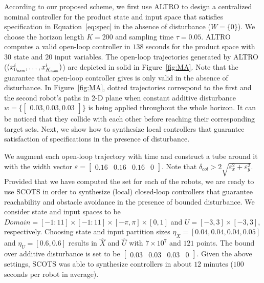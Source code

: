 According to our proposed scheme, we first use ALTRO to design a centralized nominal controller for the product state and input space that satisfies specification in Equation~\eqref{eq:spec} in the absence of disturbance ($W=\{0\}$). We choose the horizon length $K=200$ and sampling time $\tau=0.05$. ALTRO computes a valid open-loop controller in $138$ seconds for the product space with $30$ state and $20$ input variables. The open-loop trajectories generated by ALTRO ($(x_{0_{\mathit{nom}}}^i,\ldots,x_{K_{\mathit{nom}}}^i)$) are depicted in solid in Figure~\ref{fig:MA}. Note that the guarantee that open-loop controller gives is only valid in the absence of disturbance. In Figure~\ref{fig:MA}, dotted trajectories correspond to the first and the second robot's paths in 2-D plane when constant additive disturbance $w=\{\begin{bmatrix}0.03,0.03,0.03\end{bmatrix}\}$ is being applied throughout the whole horizon. It can be noticed that they collide with each other before reaching their corresponding target sets. Next, we show how to synthesize local controllers that guarantee satisfaction of specifications in the presence of disturbance. 

We augment each open-loop trajectory with time and construct a tube around it with the width vector $\varepsilon=\begin{bmatrix}0.16&0.16&0.16&0\end{bmatrix}$. Note that $\delta_{col} > 2\sqrt{\varepsilon_x^2+\varepsilon_y^2}$. Provided that we have computed the set for each of the robots, we are ready to use SCOTS in order to synthesize (local) closed-loop controllers that guarantee reachability and obstacle avoidance in the presence of bounded disturbance. We consider state and input spaces to be $Domain=[-1:11]\times[-1:11]\times[-\pi,\pi]\times[0,1]$ and
$U=[-3,3]\times[-3,3]$, respectively. Choosing state and input partition sizes $\eta_{\widetilde{X}}=[0.04,0.04,0.04,0.05]$ and
$\eta_{U}=[0.6,0.6]$ results in $\hat X$ and $\hat U$ with $7\times 10^7$ and $121$ points. The bound over additive disturbance is set to be $\begin{bmatrix}0.03&0.03&0.03&0\end{bmatrix}$. Given the above settings, SCOTS was able to synthesize controllers in about $12$ minutes ($100$ seconds per robot in average). 

